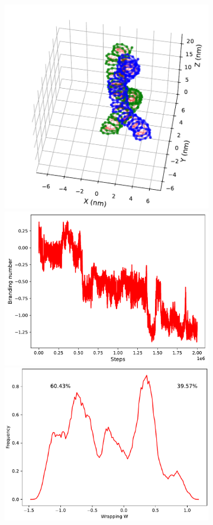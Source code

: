 \documentclass[a4paper,10pt]{article}
\begin{document}
\begin{figure}[htbp]
\begin{subfigure}{.3\textwidth}
\includegraphics[width=\textwidth]{brD_150_2000000.pdf}
\includegraphics[width=\textwidth]{brD_150_brand.pdf}
\includegraphics[width=\textwidth]{brD_150_br_pr.pdf}

\end{subfigure}
\end{figure}
\end{document}
